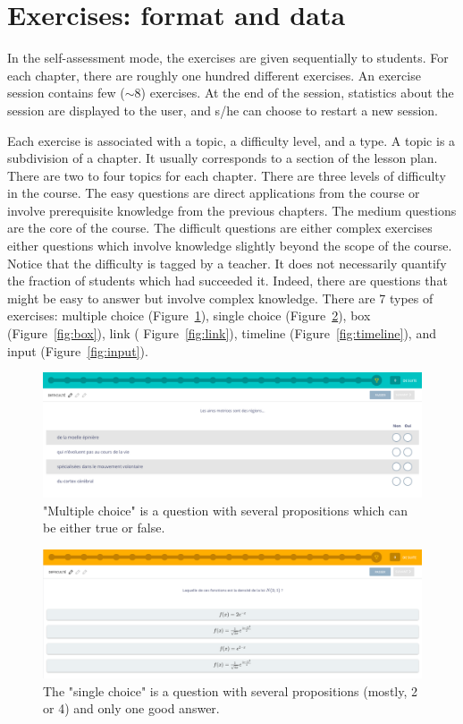 \section{Exercises: format and data}
In the self-assessment mode, the exercises are given sequentially to students. For each chapter, there are roughly one hundred different exercises. An exercise session contains few ($\sim 8$) exercises. At the end of the session, statistics about the session are displayed to the user, and s/he can choose to restart a new session. 

Each exercise is associated with a topic, a difficulty level, and a type. A topic is a subdivision of a chapter. It usually corresponds to a section of the lesson plan. There are two to four topics for each chapter. There are three levels of difficulty in the course. The easy questions are direct applications from the course or involve prerequisite knowledge from the previous chapters. The medium questions are the core of the course. The difficult questions are either complex exercises either questions which involve knowledge slightly beyond the scope of the course. Notice that the difficulty is tagged by a teacher. It does not necessarily quantify the fraction of students which had succeeded it. Indeed, there are questions that might be easy to answer but involve complex knowledge. There are 7 types of exercises: multiple choice (Figure~\ref{fig:qcm}), single choice (Figure~\ref{fig:qcu}), box (Figure~\ref{fig:box}), link ( Figure~\ref{fig:link}), timeline (Figure~\ref{fig:timeline}), and input (Figure~\ref{fig:input}).  

\begin{figure}[!ht]
\centering
\includegraphics[clip, width= \textwidth]{2literature/fig/qcm.png}
\caption{"Multiple choice" is a question with several propositions which can be either true or false. }
\label{fig:qcm}
\end{figure}

\begin{figure}[!ht]
\centering
\includegraphics[clip, width= \textwidth]{2literature/fig/qcu.png}
\caption{The "single choice" is a question with several propositions (mostly, 2 or 4) and only one good answer.}
\label{fig:qcu}
\end{figure}

